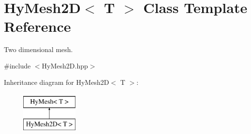 \hypertarget{classHyMesh2D}{
\section{HyMesh2D$<$ T $>$ Class Template Reference}
\label{classHyMesh2D}
}


Two dimensional mesh.  




{\ttfamily \#include $<$HyMesh2D.hpp$>$}

Inheritance diagram for HyMesh2D$<$ T $>$:\begin{figure}[H]
\begin{center}
\leavevmode
\includegraphics[height=2cm]{classHyMesh2D}
\end{center}
\end{figure}
